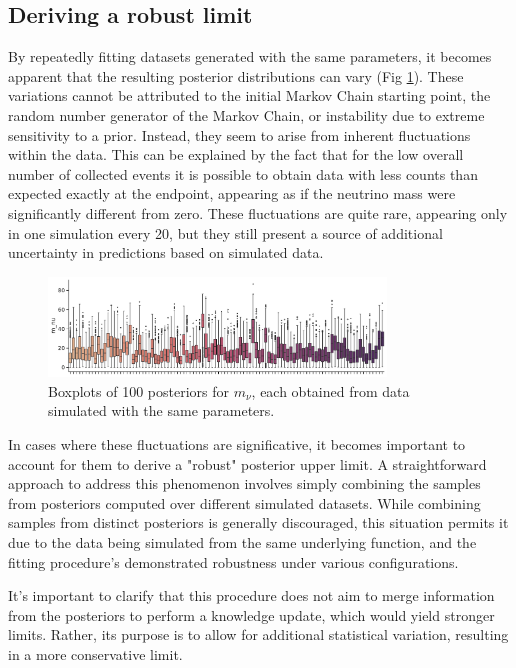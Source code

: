 \subsection{Deriving a robust limit}


By repeatedly fitting datasets generated with the same parameters, it becomes apparent that the
resulting posterior distributions can vary (Fig \ref{fig:endmany}). These variations cannot be attributed to the initial
Markov Chain starting point, the random number generator of the Markov Chain, or instability due to extreme sensitivity
to a prior. Instead, they seem to arise from inherent fluctuations within the data. This can be explained by the fact
that for the low overall number of collected events it is possible to obtain data with less counts than expected
exactly at the endpoint, appearing as if the neutrino mass were significantly different from zero. These fluctuations
are quite rare, appearing only in one simulation every 20, but they still present a source of additional uncertainty in
predictions based on simulated data.
\begin{figure}[b]
  \centering
  \includegraphics[width=0.8\textwidth]{figures/ch3/endpoint/cat_plot_0.pdf}
  \caption{Boxplots of 100 posteriors for $m_{\nu}$, each obtained from data simulated with the same parameters.}
  \label{fig:endmany}
\end{figure}

In cases where these fluctuations are significative, it becomes important to account for them to derive a "robust"
posterior upper limit. A straightforward approach to address this phenomenon involves simply combining the samples from
posteriors computed over different simulated datasets. While combining samples from distinct posteriors is generally
discouraged, this situation permits it due to the data being simulated from the same underlying function, and the fitting procedure's demonstrated robustness under various configurations.

It's important to clarify that this procedure does not aim to merge information from the posteriors to perform a
knowledge update, which would yield stronger limits. Rather, its purpose is to allow for additional statistical variation, resulting in a more conservative limit.

